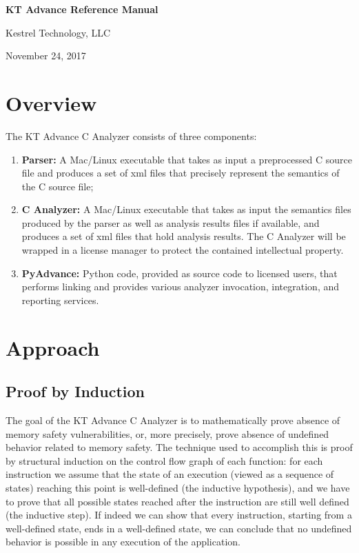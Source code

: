 \documentclass[11pt]{article}
\begin{document}
\vfill
\vfill


{\Large\bf{
KT Advance Reference Manual}}

\vfill

{\Large{Kestrel Technology, LLC}}

\bigskip

November 24, 2017

\vfill
\vfill
\vfill

\newpage
\tableofcontents
\newpage

\section{Overview}

The KT Advance C Analyzer consists of three components:
\begin{enumerate}
\item {\bf Parser:} A Mac/Linux executable that takes as input a preprocessed
C source file and produces a set of xml files that precisely represent the
semantics of the C source file;
\item {\bf C Analyzer:} A Mac/Linux executable that takes as input the
semantics files produced by the parser as well as analysis results files if
available, and produces a set of xml files that hold analysis results. The
C Analyzer will be wrapped in a license manager to protect the contained 
intellectual property.
\item {\bf PyAdvance:} Python code, provided as source code to licensed
users, that performs linking and provides various analyzer invocation, 
integration, and reporting services.
\end{enumerate}

\section{Approach}

\subsection{Proof by Induction}

The goal of the KT Advance C Analyzer is to mathematically prove absence
of memory safety vulnerabilities, or, more precisely, prove absence of
undefined behavior related to memory safety. The technique used to accomplish 
this is proof
by structural induction on the control flow graph of each function: for each
instruction we assume that the state of an execution (viewed as a sequence of states) 
reaching this point is well-defined
(the inductive hypothesis), and we have to prove that all possible states
reached after the instruction are still well defined (the inductive step).
If indeed we can show that every instruction, starting from a well-defined
state, ends in a well-defined state, we can conclude that no undefined
behavior is possible in any execution of the application.
\end{document}
